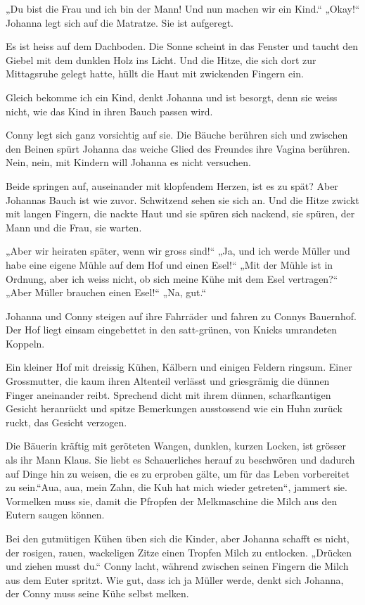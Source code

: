 \documentclass[10pt,titlepage,a5paper]{book}
\begin{document}
„Du bist die Frau und ich bin der Mann! Und nun machen wir ein Kind.“ „Okay!“ Johanna legt sich auf die Matratze. Sie ist aufgeregt.

Es ist heiss auf dem Dachboden. Die Sonne scheint in das Fenster und taucht den Giebel mit dem dunklen Holz ins Licht. Und die Hitze, die sich dort zur Mittagsruhe gelegt hatte, hüllt die Haut mit zwickenden Fingern ein.

Gleich bekomme ich ein Kind, denkt Johanna und ist besorgt, denn sie weiss nicht, wie das Kind in ihren Bauch passen wird.

Conny legt sich ganz vorsichtig auf sie. Die Bäuche berühren sich und zwischen den Beinen spürt Johanna das weiche Glied des Freundes ihre Vagina berühren. Nein, nein, mit Kindern will Johanna es nicht versuchen.

Beide springen auf, auseinander mit klopfendem Herzen, ist es zu spät? Aber Johannas Bauch ist wie zuvor. Schwitzend sehen sie sich an. Und die Hitze zwickt mit langen Fingern, die nackte Haut und sie spüren sich nackend, sie spüren, der Mann und die Frau, sie warten.

„Aber wir heiraten später, wenn wir gross sind!“ „Ja, und ich werde Müller und habe eine eigene Mühle auf dem Hof und einen Esel!“ „Mit der Mühle ist in Ordnung, aber ich weiss nicht, ob sich meine Kühe mit dem Esel vertragen?“ „Aber Müller brauchen einen Esel!“ „Na, gut.“

Johanna und Conny steigen auf ihre Fahrräder und fahren zu Connys Bauernhof. Der Hof liegt einsam eingebettet in den satt-grünen, von Knicks umrandeten Koppeln.

Ein kleiner Hof mit dreissig Kühen, Kälbern und einigen Feldern ringsum. Einer Grossmutter, die kaum ihren Altenteil verlässt und griesgrämig die dünnen Finger aneinander  reibt. Sprechend dicht mit ihrem dünnen, scharfkantigen Gesicht heranrückt und spitze Bemerkungen ausstossend wie ein Huhn zurück ruckt, das Gesicht verzogen.

Die Bäuerin kräftig mit geröteten Wangen, dunklen, kurzen Locken, ist grösser als ihr Mann Klaus. Sie liebt es Schauerliches herauf zu beschwören und dadurch auf Dinge hin zu weisen, die es zu erproben gälte, um für das Leben vorbereitet zu sein.“Aua, aua, mein Zahn, die Kuh hat mich wieder getreten“, jammert sie. Vormelken muss sie, damit die Pfropfen der Melkmaschine die Milch aus den Eutern saugen können.

Bei den gutmütigen Kühen üben sich die Kinder, aber Johanna schafft es nicht, der rosigen, rauen, wackeligen Zitze einen Tropfen Milch zu entlocken. „Drücken und ziehen musst du.“ Conny lacht, während zwischen seinen Fingern die Milch aus dem Euter spritzt. Wie gut, dass ich ja Müller werde, denkt sich Johanna, der Conny muss seine Kühe selbst melken.
\end{document}
